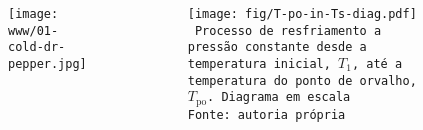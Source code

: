     \begin{frame}\vspace*{-2em}
        \begin{columns}
            \begin{center}                                               
                \begin{figure}                                           
                    \fontsize{5.0}{5}\selectfont                         
                    \texttt{[image: www/01-cold-dr-pepper.jpg]}   
                    \\\vspace*{-1em}            
                \end{figure}                                             
            \end{center}                                                 
            \begin{center}
                \begin{figure}
                    \fontsize{5.0}{5}\selectfont
                    \texttt{[image: fig/T-po-in-Ts-diag.pdf]}
                    \\\vspace*{-0.0em}\texttt{%
                        Processo de resfriamento a pressão constante desde a temperatura
                        inicial, $T_1$, até a temperatura do ponto de orvalho,
                        $T_{\mathrm{po}}$. Diagrama em escala \\
                        Fonte: autoria própria
                    }
                \end{figure}
            \end{center}
        \end{columns}
    \end{frame}

